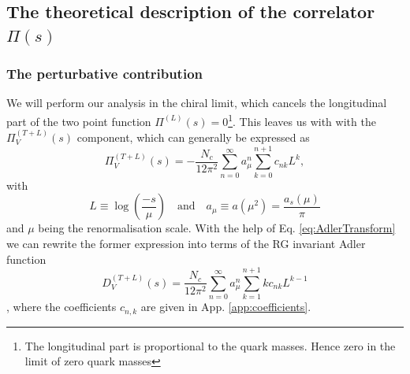 \subsection{The theoretical description of the correlator $\Pi(s)$}
\subsubsection{The perturbative contribution}
We will perform our analysis in the chiral limit, which cancels the longitudinal part of the two point function $\Pi^{(L)}(s) = 0$\footnote{The longitudinal part is proportional to the quark masses. Hence zero in the limit of zero quark masses}. This leaves us with with the $\Pi_V^{(T+L)}(s)$ component, which can generally be expressed as \cite{Jamin2008}
\begin{equation}
	\Pi^{(T+L)}_V (s) = - \frac{N_c}{12 \pi^2} \sum_{n=0}^{\infty} a_\mu^n \sum_{k=0}^{n+1} c_{nk} L^k,
\end{equation}
with
\begin{equation}
	L\equiv\log\left(\frac{-s}{\mu}\right) \quad \text{and} \quad a_\mu \equiv a(\mu^2) = \frac{a_s(\mu)}{\pi}
\end{equation}
and $\mu$ being the renormalisation scale.
With the help of Eq. \eqref{eq:AdlerTransform} we can rewrite the former expression into terms of the RG invariant Adler function
\begin{equation}
	D_V^{(T+L)} (s) = \frac{N_c}{12 \pi^2} \sum_{n=0}^\infty a_\mu^n \sum_{k=1}^{n+1} k c_{nk} L^{k-1}
\end{equation},
where the coefficients $c_{n,k}$ are given in App. \ref{app:coefficients}.

